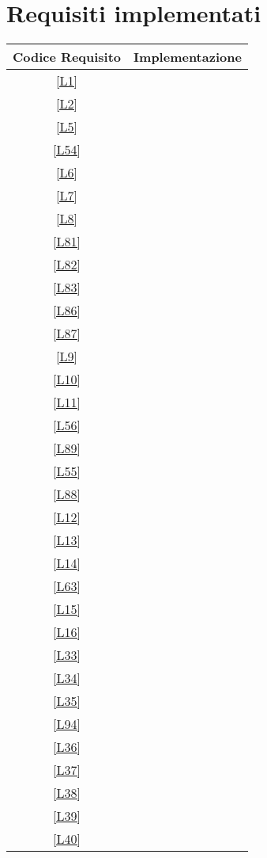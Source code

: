 \section{Requisiti implementati}
\begin{longtable}{|c|c|}
	\hline \textbf{Codice Requisito} & \textbf{Implementazione} \\
	\hline \ref{L1} & \si \\ %
	\hline \ref{L2} & \no \\
	\hline \ref{L5} & \si  \\	
	\hline \ref{L54} & \si \\
	\hline \ref{L6} & \si \\ %
	\hline \ref{L7} & \si \\
	\hline \ref{L8} & \si \\
	\hline \ref{L81} & \si \\
	\hline \ref{L82} & \si \\
	\hline \ref{L83} & \si \\ %
	\hline \ref{L86} & \si \\
	\hline \ref{L87} & \si \\
	\hline \ref{L9} & \si \\
	\hline \ref{L10} & \si \\
	\hline \ref{L11} & \si  \\ %
	\hline \ref{L56} & \si \\
	\hline \ref{L89} & \si \\
	\hline \ref{L55} & \si \\
	\hline \ref{L88} & \si \\
	\hline \ref{L12} & \si \\ %
	\hline \ref{L13} & \si \\
	\hline \ref{L14} & \si \\
	\hline \ref{L63} & \si \\
	\hline \ref{L15} & \si \\
	\hline \ref{L16} & \si \\ %
	\hline \ref{L33} & \si \\
	\hline \ref{L34} & \si \\
	\hline \ref{L35} & \no \\
	\hline \ref{L94} & \no \\
	\hline \ref{L36} & \no \\ %
	\hline \ref{L37} & \no  \\
	\hline \ref{L38} & \si \\
	\hline \ref{L39} & \no \\
	\hline \ref{L40} & \no \\	

\end{longtable}
